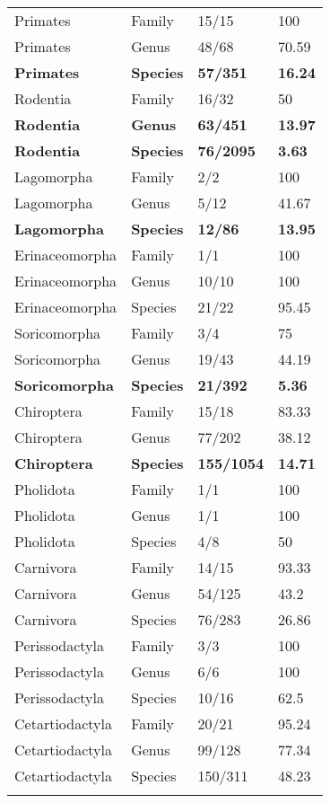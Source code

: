 \begin{longtable}{llll}
  Primates & Family & 15/15 & 100 \\ 
  Primates & Genus & 48/68 & 70.59 \\ 
  \textbf{Primates} & \textbf{Species} & \textbf{57/351} & \textbf{16.24} \\ 
  Rodentia & Family & 16/32 & 50 \\ 
  \textbf{Rodentia} & \textbf{Genus} & \textbf{63/451} & \textbf{13.97} \\ 
  \textbf{Rodentia} & \textbf{Species} & \textbf{76/2095} & \textbf{3.63} \\ 
  Lagomorpha & Family & 2/2 & 100 \\ 
  Lagomorpha & Genus & 5/12 & 41.67 \\ 
  \textbf{Lagomorpha} & \textbf{Species} & \textbf{12/86} & \textbf{13.95} \\ 
  Erinaceomorpha & Family & 1/1 & 100 \\ 
  Erinaceomorpha & Genus & 10/10 & 100 \\ 
  Erinaceomorpha & Species & 21/22 & 95.45 \\ 
  Soricomorpha & Family & 3/4 & 75 \\ 
  Soricomorpha & Genus & 19/43 & 44.19 \\ 
  \textbf{Soricomorpha} & \textbf{Species} & \textbf{21/392} & \textbf{5.36} \\ 
  Chiroptera & Family & 15/18 & 83.33 \\ 
  Chiroptera & Genus & 77/202 & 38.12 \\ 
  \textbf{Chiroptera} & \textbf{Species} & \textbf{155/1054} & \textbf{14.71} \\ 
  Pholidota & Family & 1/1 & 100 \\ 
  Pholidota & Genus & 1/1 & 100 \\ 
  Pholidota & Species & 4/8 & 50 \\ 
  Carnivora & Family & 14/15 & 93.33 \\ 
  Carnivora & Genus & 54/125 & 43.2 \\ 
  Carnivora & Species & 76/283 & 26.86 \\ 
  Perissodactyla & Family & 3/3 & 100 \\ 
  Perissodactyla & Genus & 6/6 & 100 \\ 
  Perissodactyla & Species & 10/16 & 62.5 \\ 
  Cetartiodactyla & Family & 20/21 & 95.24 \\ 
  Cetartiodactyla & Genus & 99/128 & 77.34 \\ 
  Cetartiodactyla & Species & 150/311 & 48.23 \\ 
   \hline
\hline
\label{morpho_taxa_proportion_threshold1}
\end{longtable}
